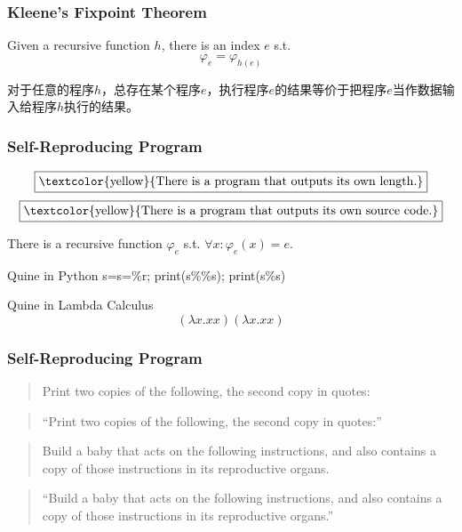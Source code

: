 \documentclass[UTF8,11pt,colorlinks,compress,openany]{beamer}%
\begin{document}
\begin{frame}\frametitle{Kleene's Fixpoint Theorem}
\setlength\abovedisplayskip{0pt}
\setlength\belowdisplayskip{0pt}
	\begin{theorem}
		Given a recursive function $h$, there is an index $e$ s.t.
		\[\varphi_e=\varphi_{h(e)}\]
	\end{theorem}
对于任意的程序$h$，总存在某个程序$e$，执行程序$e$的结果等价于把程序$e$当作数据输入给程序$h$执行的结果。
\end{frame}

\begin{frame}\frametitle{Self-Reproducing Program}
	\[\fbox{\textcolor{yellow}{There is a program that outputs its own length.}}\]
	\[\fbox{\textcolor{yellow}{There is a program that outputs its own source code.}}\]
	\begin{corollary}
		There is a recursive function $\varphi_e$ s.t. $\forall x: \varphi_e(x)=e$.
	\end{corollary}
\begin{block}{Quine in Python}
s=\textquotesingle s=\%r; print(s\%\%s)\textquotesingle; print(s\%s)
\end{block}
\begin{block}{Quine in Lambda Calculus}
\[(\lambda x.xx)(\lambda x.xx)\]
\end{block}
\end{frame}

\begin{frame}\frametitle{Self-Reproducing Program}
\begin{block}{}
	\begin{quote}
		Print two copies of the following, the second copy in quotes:
	\end{quote}
	\begin{quote}
		``Print two copies of the following, the second copy in quotes:''
	\end{quote}
\end{block}
	\centerline{\fbox{\textcolor{green}{DNA / mutation / evolution}}}
\begin{block}{}
	\begin{quote}
		Build a baby that acts on the following instructions, and also contains a copy of those instructions in its reproductive organs.
	\end{quote}
	\begin{quote}
		``Build a baby that acts on the following instructions, and also contains a copy of those instructions in its reproductive organs.''
	\end{quote}
\end{block}
\end{frame}
\end{document}
